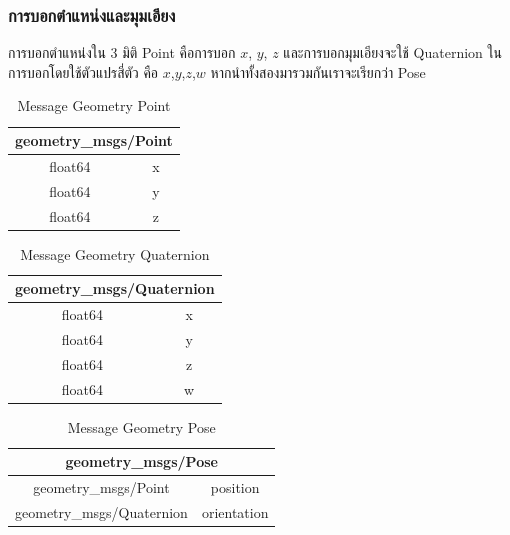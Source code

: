 \subsubsection*{การบอกตำแหน่งและมุมเอียง}
การบอกตำแหน่งใน 3 มิติ Point คือการบอก $x$, $y$, $z$ และการบอกมุมเอียงจะใช้ Quaternion
ในการบอกโดยใช้ตัวแปรสี่ตัว คือ $x$,$y$,$z$,$w$ หากนำทั้งสองมารวมกันเราจะเรียกว่า Pose
\begin{table}[h!]
	\centering
	\begin{tabular}{| c | c |}
		\hline
		\multicolumn{2}{|c|}{geometry\_msgs/Point}\\
		\hline
		float64 & x \\
		float64 & y \\
		float64 & z \\
		\hline
	\end{tabular}
	\caption{Message Geometry Point}
	\label{tab:geometry_point}
\end{table}
\begin{table}[h!]
	\centering
	\begin{tabular}{| c | c |}
		\hline
		\multicolumn{2}{|c|}{geometry\_msgs/Quaternion}\\
		\hline
		float64 & x \\
		float64 & y \\
		float64 & z \\
		float64 & w \\
		\hline
	\end{tabular}
	\caption{Message Geometry Quaternion}
	\label{tab:geometry_quaternion}
\end{table}
\begin{table}[h!]
	\centering
	\begin{tabular}{| c | c |}
		\hline
		\multicolumn{2}{|c|}{geometry\_msgs/Pose}\\
		\hline
		geometry\_msgs/Point & position \\
		geometry\_msgs/Quaternion & orientation \\
		\hline
	\end{tabular}
	\caption{Message Geometry Pose}
	\label{tab:geometry_pose}
\end{table}

